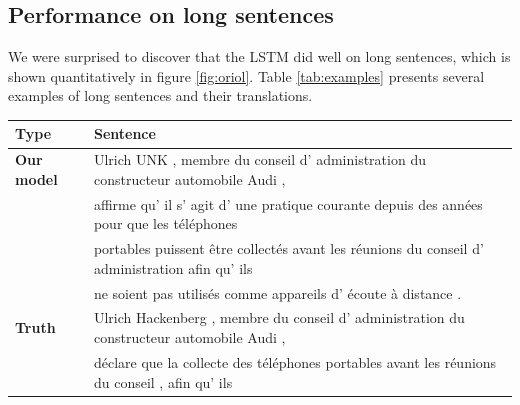 \subsection{Performance on long sentences}
\label{sec:long_sentences}

We were surprised to discover that the LSTM did well on long
sentences, which is shown quantitatively in figure \ref{fig:oriol}.
Table \ref{tab:examples} presents several examples of long sentences and
their translations. 

\begin{table}[ht!]
\centering
\begin{footnotesize}
\begin{tabular}{|l|l|}
\hline
{\bf  Type} & {\bf Sentence} \\ 
\hline
\hline
{\bf Our model} & Ulrich UNK , membre du conseil d' administration du constructeur automobile Audi , \\
& affirme qu' il s' agit d' une pratique courante depuis des ann\'{e}es pour que les t\'{e}l\'{e}phones \\
& portables  puissent  \^{e}tre collect\'{e}s avant les r\'{e}unions du conseil d' administration afin qu' ils\\
&  ne soient pas  utilis\'{e}s comme appareils d' \'{e}coute \`{a} distance .\\
\hline
{\bf  Truth} &  Ulrich Hackenberg , membre du conseil d' administration du constructeur automobile Audi ,   \\
& d\'{e}clare que la collecte des t\'{e}l\'{e}phones portables avant les r\'{e}unions du conseil , afin qu' ils  \\

\end{tabular}
\end{footnotesize}
\end{table}
